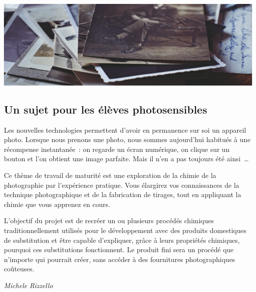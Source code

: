 \documentclass[
  10pt,
  french,
  a5paper,
  openany]{book}
\newenvironment{signature}{\begin{flushright}}{\end{flushright}}
\begin{document}
\begin{center}
\includegraphics[width=1\textwidth,height=\textheight]{images/chimie-et-photographie.jpg}

\end{center}


\hypertarget{un-sujet-pour-les-uxe9luxe8ves-photosensibles}{%
\subsection*{Un sujet pour les élèves photosensibles}\label{un-sujet-pour-les-uxe9luxe8ves-photosensibles}}

Les nouvelles technologies permettent d'avoir en permanence sur soi un appareil photo. Lorsque nous prenons une photo, nous sommes aujourd'hui habitués à une récompense instantanée~: on regarde un écran numérique, on clique sur un bouton et l'on obtient une image parfaite. Mais il n'en a pas toujours été ainsi~\ldots{}

Ce thème de travail de maturité est une exploration de la chimie de la photographie par l'expérience pratique. Vous élargirez vos connaissances de la technique photographique et de la fabrication de tirages, tout en appliquant la chimie que vous apprenez en cours.

L'objectif du projet est de recréer un ou plusieurs procédés chimiques traditionnellement utilisés pour le développement avec des produits domestiques de substitution et être capable d'expliquer, grâce à leurs propriétés chimiques, pourquoi ces substitutions fonctionnent. Le produit fini sera un procédé que n'importe qui pourrait créer, sans accéder à des fournitures photographiques coûteuses.

\begin{signature}
\emph{Michele Rizzello}

\end{signature}
\end{document}
